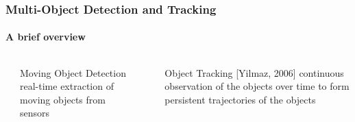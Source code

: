 \begin{frame}
	\frametitle{Multi-Object Detection and Tracking}
	\framesubtitle{A brief overview}
	
	\vspace{0.4cm}
	
	\begin{columns}[t]
		\centering
		
		{
			\vspace{0.2cm}
		}
		
		{
			\begin{block}{Moving Object Detection}
				real-time extraction of moving objects from sensors
			\end{block}
		}
		
		{
			\vspace{2.84cm}
		}
		
		\vspace{1.0cm}
		
		{
			\begin{block}{Object Tracking [Yilmaz, 2006]}
				continuous observation of the objects over time to form persistent trajectories of the objects
			\end{block}
		}
		
		\centering
		
		{
		}
		

\end{columns}
\end{frame}
